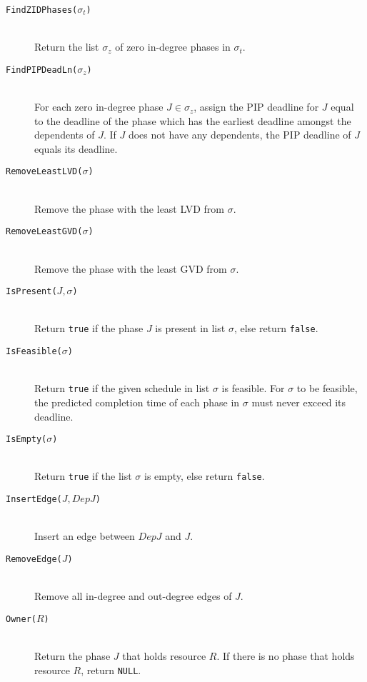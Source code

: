 \documentclass[12pt,dvips]{report}
\begin{document}
\begin{description}
	\item[\texttt{FindZIDPhases($\sigma_t$)}] \hfill \\
		Return the list $\sigma_z$ of zero in-degree phases in $\sigma_t$.

	\item[\texttt{FindPIPDeadLn($\sigma_z$)}] \hfill \\
		For each zero in-degree phase $J \in \sigma_z$, assign the PIP deadline for $J$
 		equal to the deadline of the phase which has the earliest deadline amongst the dependents of $J$. If $J$ does 
 		not have any dependents, the PIP deadline of $J$ equals its deadline.

	\item[\texttt{RemoveLeastLVD($\sigma$)}] \hfill \\
		Remove the phase with the least LVD from $\sigma$.
		
	\item[\texttt{RemoveLeastGVD($\sigma$)}] \hfill \\
		Remove the phase with the least GVD from $\sigma$.		
		
	\item[\texttt{IsPresent($J, \sigma$)}] \hfill \\
		Return \texttt{true} if the phase $J$ is present in list $\sigma$, else return \texttt{false}.
			
	\item[\texttt{IsFeasible($\sigma$)}] \hfill \\
		 Return \texttt{true} if the given schedule in list $\sigma$ is feasible. For $\sigma$ to be
		 feasible, the predicted completion time of each phase in $\sigma$ must never exceed its deadline.
	
	\item[\texttt{IsEmpty($\sigma$)}] \hfill \\
		Return \texttt{true} if the list $\sigma$ is empty, else return \texttt{false}.

	\item[\texttt{InsertEdge($J, DepJ$)}] \hfill \\
		Insert an edge between $DepJ$ and $J$.

	\item[\texttt{RemoveEdge($J$)}]	\hfill \\
		Remove all in-degree and out-degree edges of $J$.
	
	\item[\texttt{Owner($R$)}]	\hfill \\
		Return the phase $J$ that holds resource $R$. If there is no phase that holds resource $R$, return \texttt{NULL}.
	

\end{description}
\end{document}
